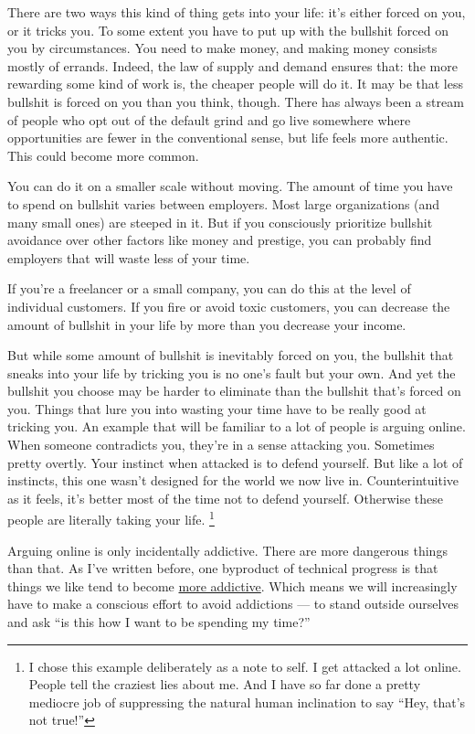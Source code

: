 There are two ways this kind of thing gets into your life: it's either
forced on you, or it tricks you. To some extent you have to put up with
the bullshit forced on you by circumstances. You need to make money, and
making money consists mostly of errands. Indeed, the law of supply and
demand ensures that: the more rewarding some kind of work is, the
cheaper people will do it. It may be that less bullshit is forced on you
than you think, though. There has always been a stream of people who opt
out of the default grind and go live somewhere where opportunities are
fewer in the conventional sense, but life feels more authentic. This
could become more common.

You can do it on a smaller scale without moving. The amount of time you
have to spend on bullshit varies between employers. Most large
organizations (and many small ones) are steeped in it. But if you
consciously prioritize bullshit avoidance over other factors like money
and prestige, you can probably find employers that will waste less of
your time.

If you're a freelancer or a small company, you can do this at the level
of individual customers. If you fire or avoid toxic customers, you can
decrease the amount of bullshit in your life by more than you decrease
your income.

But while some amount of bullshit is inevitably forced on you, the
bullshit that sneaks into your life by tricking you is no one's fault
but your own. And yet the bullshit you choose may be harder to eliminate
than the bullshit that's forced on you. Things that lure you into
wasting your time have to be really good at tricking you. An example
that will be familiar to a lot of people is arguing online. When someone
contradicts you, they're in a sense attacking you. Sometimes pretty
overtly. Your instinct when attacked is to defend yourself. But like a
lot of instincts, this one wasn't designed for the world we now live in.
Counterintuitive as it feels, it's better most of the time not to defend
yourself. Otherwise these people are literally taking your life.
\footnote{I chose this example deliberately as a note to self. I get
attacked a lot online. People tell the craziest lies about me. And I
have so far done a pretty mediocre job of suppressing the natural human
inclination to say ``Hey, that's not true!''}

Arguing online is only incidentally addictive. There are more dangerous
things than that. As I've written before, one byproduct of technical
progress is that things we like tend to become
\href{addiction.html}{more addictive}. Which means we will increasingly
have to make a conscious effort to avoid addictions --- to stand outside
ourselves and ask ``is this how I want to be spending my time?''

